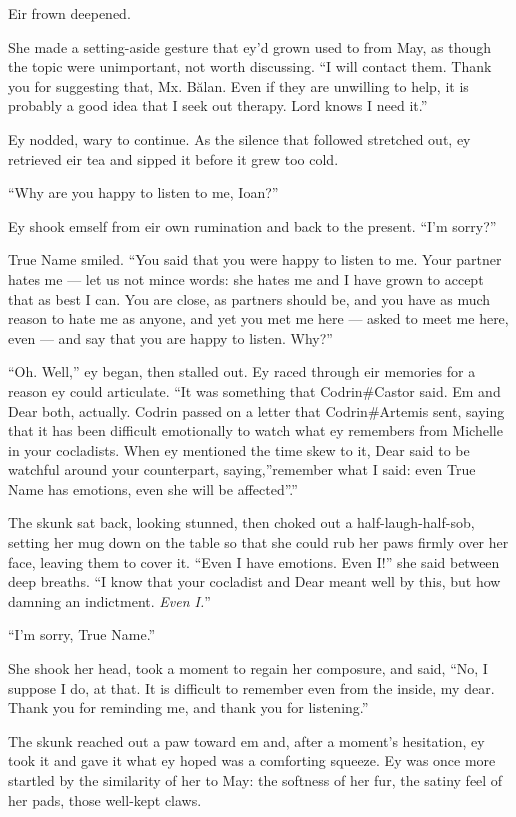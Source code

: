 Eir frown deepened.

She made a setting-aside gesture that ey'd grown used to from May, as though the topic were unimportant, not worth discussing. ``I will contact them. Thank you for suggesting that, Mx. Bălan. Even if they are unwilling to help, it is probably a good idea that I seek out therapy. Lord knows I need it.''

Ey nodded, wary to continue. As the silence that followed stretched out, ey retrieved eir tea and sipped it before it grew too cold.

``Why are you happy to listen to me, Ioan?''

Ey shook emself from eir own rumination and back to the present. ``I'm sorry?''

True Name smiled. ``You said that you were happy to listen to me. Your partner hates me — let us not mince words: she hates me and I have grown to accept that as best I can. You are close, as partners should be, and you have as much reason to hate me as anyone, and yet you met me here — asked to meet me here, even — and say that you are happy to listen. Why?''

``Oh. Well,'' ey began, then stalled out. Ey raced through eir memories for a reason ey could articulate. ``It was something that Codrin\#Castor said. Em and Dear both, actually. Codrin passed on a letter that Codrin\#Artemis sent, saying that it has been difficult emotionally to watch what ey remembers from Michelle in your cocladists. When ey mentioned the time skew to it, Dear said to be watchful around your counterpart, saying,''remember what I said: even True Name has emotions, even she will be affected''.''

The skunk sat back, looking stunned, then choked out a half-laugh-half-sob, setting her mug down on the table so that she could rub her paws firmly over her face, leaving them to cover it. ``Even I have emotions. Even I!'' she said between deep breaths. ``I know that your cocladist and Dear meant well by this, but how damning an indictment. \emph{Even I.}''

``I'm sorry, True Name.''

She shook her head, took a moment to regain her composure, and said, ``No, I suppose I do, at that. It is difficult to remember even from the inside, my dear. Thank you for reminding me, and thank you for listening.''

The skunk reached out a paw toward em and, after a moment's hesitation, ey took it and gave it what ey hoped was a comforting squeeze. Ey was once more startled by the similarity of her to May: the softness of her fur, the satiny feel of her pads, those well-kept claws.

